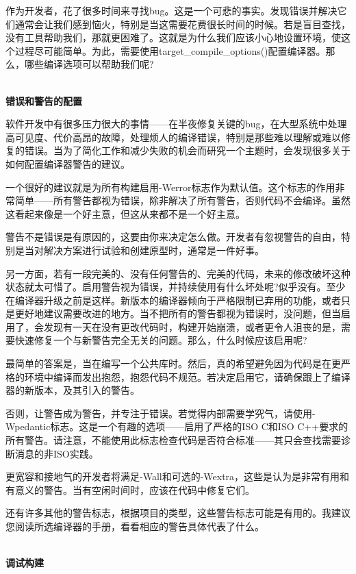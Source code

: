 作为开发者，花了很多时间来寻找bug。这是一个可悲的事实。发现错误并解决它们通常会让我们感到恼火，特别是当这需要花费很长时间的时候。若是盲目查找，没有工具帮助我们，那就更困难了。这就是为什么我们应该小心地设置环境，使这个过程尽可能简单。为此，需要使用target\_compile\_options()配置编译器。那么，哪些编译选项可以帮助我们呢?

\hspace*{\fill} \\ %
\noindent
\textbf{错误和警告的配置}

软件开发中有很多压力很大的事情——在半夜修复关键的bug，在大型系统中处理高可见度、代价高昂的故障，处理烦人的编译错误，特别是那些难以理解或难以修复的错误。当为了简化工作和减少失败的机会而研究一个主题时，会发现很多关于如何配置编译器警告的建议。

一个很好的建议就是为所有构建启用-Werror标志作为默认值。这个标志的作用非常简单——所有警告都视为错误，除非解决了所有警告，否则代码不会编译。虽然这看起来像是一个好主意，但这从来都不是一个好主意。

警告不是错误是有原因的，这要由你来决定怎么做。开发者有忽视警告的自由，特别是当对解决方案进行试验和创建原型时，通常是一件好事。

另一方面，若有一段完美的、没有任何警告的、完美的代码，未来的修改破坏这种状态就太可惜了。启用警告视为错误，并持续使用有什么坏处呢?似乎没有。至少在编译器升级之前是这样。新版本的编译器倾向于严格限制已弃用的功能，或者只是更好地建议需要改进的地方。当不把所有的警告都视为错误时，没问题，但当启用了，会发现有一天在没有更改代码时，构建开始崩溃，或者更令人沮丧的是，需要快速修复一个与新警告完全无关的问题。那么，什么时候应该启用呢?

最简单的答案是，当在编写一个公共库时。然后，真的希望避免因为代码是在更严格的环境中编译而发出抱怨，抱怨代码不规范。若决定启用它，请确保跟上了编译器的新版本，及其引入的警告。

否则，让警告成为警告，并专注于错误。若觉得内部需要学究气，请使用-Wpedantic标志。这是一个有趣的选项——启用了严格的ISO C和ISO C++要求的所有警告。请注意，不能使用此标志检查代码是否符合标准——其只会查找需要诊断消息的非ISO实践。

更宽容和接地气的开发者将满足-Wall和可选的-Wextra，这些是认为是非常有用和有意义的警告。当有空闲时间时，应该在代码中修复它们。

还有许多其他的警告标志，根据项目的类型，这些警告标志可能是有用的。我建议您阅读所选编译器的手册，看看相应的警告具体代表了什么。

\hspace*{\fill} \\ %
\noindent
\textbf{调试构建}

